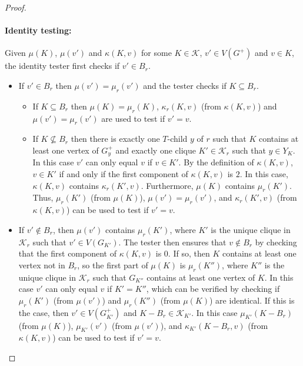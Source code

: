\documentclass{patmorin}
\newcommand{\gwen}[1]{\textcolor{Purple}{GJ: #1}}
\newcommand{\calK}{\mathcal{K}}
\begin{document}
\begin{proof}
    \paragraph{Identity testing:}
  Given $\mu(K)$, $\mu(v')$ and $\kappa(K,v)$ for some $K\in\calK$, $v'\in V(G^+)$ and $v\in K$, the identity tester first checks if $v'\in B_r$.
  \begin{itemize}
      \item If $v'\in B_r$ then $\mu(v')=\mu_r(v')$ and the tester checks if $K\subseteq B_r$.
      \begin{itemize}
          \item If $K\subseteq B_r$ then $\mu(K)=\mu_r(K)$, $\kappa_r(K,v)$ (from $\kappa(K,v)$) and $\mu(v')=\mu_r(v')$ are used to test if $v'=v$.
          \item If $K\not\subseteq B_r$ then there is exactly one $T$-child $y$ of $r$ such that $K$ contains at least one vertex of $G^+_y$ and exactly one clique $K'\in\calK_r$ such that $y\in Y_K$.
          In this case $v'$ can only equal $v$ if $v\in K'$.
          By the definition of $\kappa(K,v)$, $v\in K'$ if and only if the first component of $\kappa(K,v)$ is $2$.
          In this case, $\kappa(K,v)$ contains $\kappa_r(K',v)$.  Furthermore, $\mu(K)$ contains $\mu_r(K')$.
          Thus, $\mu_r(K')$ (from $\mu(K)$), $\mu(v')=\mu_r(v')$, and $\kappa_r(K',v)$ (from $\kappa(K,v)$) can be used to test if $v'=v$.
      \end{itemize}
      \item If $v'\not\in B_r$, then $\mu(v')$ contains $\mu_r(K')$, where $K'$ is the unique clique in $\calK_r$ such that $v'\in V(G_{K'})$.
      The tester then ensures that $v\not\in B_r$ by checking that the first component of $\kappa(K,v)$ is $0$.
      If so, then $K$ contains at least one vertex not in $B_r$, so the first part of $\mu(K)$ is $\mu_r(K'')$, where $K''$ is the unique clique in $\calK_r$ such that $G_{K''}$ contains at least one vertex of $K$.
      In this case $v'$ can only equal $v$ if $K'=K''$, which can be verified by checking if $\mu_r(K')$ (from $\mu(v')$) and $\mu_r(K'')$ (from $\mu(K)$) are identical.
      If this is the case, then $v'\in V(G^+_{K'})$ and $K-B_r\in\calK_{K'}$.
      In this case $\mu_{K'}(K-B_r)$ (from $\mu(K)$), $\mu_{K'}(v')$ (from $\mu(v')$), and $\kappa_{K'}(K-B_r, v)$ (from $\kappa(K,v)$) can be used to test if $v'=v$. \qedhere
  \end{itemize}
  \end{proof}

\end{document}
